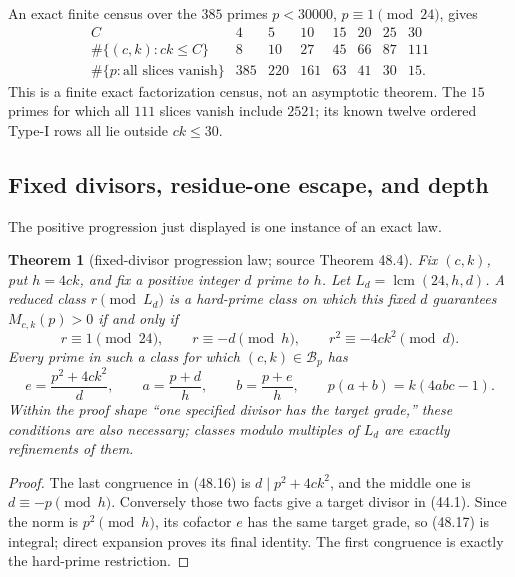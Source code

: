 \documentclass[10pt,reqno]{amsart}
\newtheorem{theorem}{Theorem}[section]
\theoremstyle{definition}
\newcommand{\lcm}{\operatorname {lcm}}
\newcommand{\1}{\mathbf 1}
\begin{document}
An exact finite census over the $385$ primes $p<30000$,
$p\equiv1\pmod{24}$, gives
\[
\begin{array}{c|rrrrrrr}
 C&4&5&10&15&20&25&30\\ \hline
 \#\{(c,k):ck\leq C\}&8&10&27&45&66&87&111\\
 \#\{p:\text{all slices vanish}\}&385&220&161&63&41&30&15.
\end{array}
\]
This is a finite exact factorization census, not an asymptotic theorem.  The
$15$ primes for which all $111$ slices vanish include $2521$; its known
twelve ordered Type-I rows all lie outside $ck\leq30$.

\subsection{Fixed divisors, residue-one escape, and depth}
The positive progression just displayed is one instance of an exact law.
\begin{theorem}[fixed-divisor progression law; source Theorem 48.4]
\label{thm:fixed-divisor-slice}
Fix $(c,k)$, put $h=4ck$, and fix a positive integer $d$ prime to $h$.
Let $L_d=\lcm(24,h,d)$.  A reduced class $r\pmod {L_d}$ is a hard-prime
class on which this fixed $d$ guarantees $M_{c,k}(p)>0$ if and only if
\begin{equation}\tag{48.16}
 r\equiv1\pmod {24},\qquad r\equiv-d\pmod h,
 \qquad r^2\equiv-4ck^2\pmod d.
\end{equation}
Every prime in such a class for which $(c,k)\in\mathcal B_p$ has
\begin{equation}\tag{48.17}
 e=\frac{p^2+4ck^2}{d},\qquad a=\frac{p+d}{h},\qquad
 b=\frac{p+e}{h},\qquad p(a+b)=k(4abc-1).
\end{equation}
Within the proof shape ``one specified divisor has the target grade,'' these
conditions are also necessary; classes modulo multiples of $L_d$ are
exactly refinements of them.
\end{theorem}
\begin{proof}
The last congruence in (48.16) is $d\mid p^2+4ck^2$, and the middle one is
$d\equiv-p\pmod h$.  Conversely those two facts give a target divisor in
(44.1).  Since the norm is $p^2\pmod h$, its cofactor $e$ has the same
target grade, so (48.17) is integral; direct expansion proves its final
identity.  The first congruence is exactly the hard-prime restriction.
\end{proof}
\end{document}
